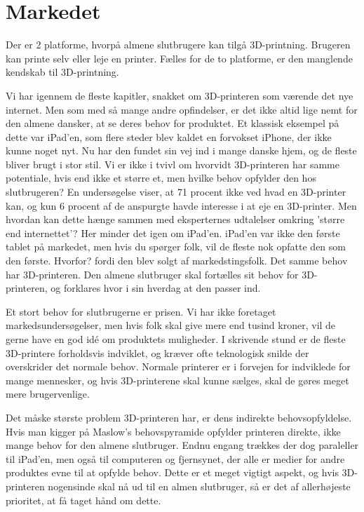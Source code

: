 \section{Markedet} %

Der er 2 platforme, hvorpå almene slutbrugere kan tilgå 3D-printning. Brugeren kan printe selv eller leje en printer. Fælles for de to platforme, er den manglende kendskab til 3D-printning.





Vi har igennem de fleste kapitler, snakket om 3D-printeren som værende det nye internet. Men som med så mange andre opfindelser, er det ikke altid lige nemt for den almene dansker, at se deres behov for produktet. Et klassisk eksempel på dette var iPad'en, som flere steder blev kaldet en forvokset iPhone, der ikke kunne noget nyt. Nu har den fundet sin vej ind i mange danske hjem, og de fleste bliver brugt i stor stil. 
Vi er ikke i tvivl om hvorvidt 3D-printeren har samme potentiale, hvis end ikke et større et, men hvilke behov opfylder den hos slutbrugeren? En undersøgelse viser, at 71 procent ikke ved hvad en 3D-printer kan, og kun 6 procent af de anspurgte havde interesse i at eje en 3D-printer.
Men hvordan kan dette hænge sammen med eksperternes udtalelser omkring 'større end internettet'? \autocite{financial_times_3d_2012} Her minder det igen om iPad'en. iPad'en var ikke den første tablet på markedet, men hvis du spørger folk, vil de fleste nok opfatte den som den første. Hvorfor? fordi den blev solgt af markedstingsfolk. Det samme behov har 3D-printeren. Den almene slutbruger skal fortælles sit behov for 3D-printeren, og forklares hvor i sin hverdag at den passer ind.

Et stort behov for slutbrugerne er prisen. Vi har ikke foretaget markedsundersøgelser, men hvis folk skal give mere end tusind kroner, vil de gerne have en god idé om produktets muligheder. I skrivende stund er de fleste 3D-printere forholdsvis indviklet, og kræver ofte teknologisk snilde der overskrider det normale behov. Normale printerer er i forvejen for indviklede for mange mennesker, og hvis 3D-printerene skal kunne sælges, skal de gøres meget mere brugervenlige.

Det måske største problem 3D-printeren har, er dens indirekte behovsopfyldelse. Hvis man kigger på Maslow's behovspyramide \autocite{abraham_harold_maslow_theory_1943} opfylder printeren direkte, ikke mange behov for den almene slutbruger. Endnu engang trækkes der dog paraleller til iPad'en, men også til computeren og fjernsynet, der alle er medier for andre produktes evne til at opfylde behov. Dette er et meget vigtigt aspekt, og hvis 3D-printeren nogensinde skal nå ud til en almen slutbruger, så er det af allerhøjeste prioritet, at få taget hånd om dette.




